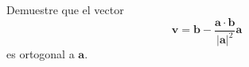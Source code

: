 \item Demuestre que el vector 
    \[
    \mathbf{v} = \mathbf{b} - \frac{\mathbf{a} \cdot \mathbf{b}}{|\mathbf{a}|^2} \mathbf{a}
    \]
    es ortogonal a $\mathbf{a}$.
